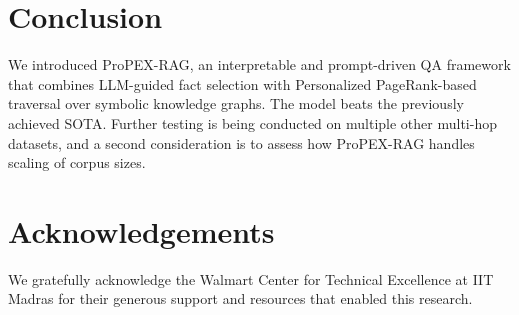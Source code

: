 \documentclass[runningheads]{llncs}
\begin{document}


\section{Conclusion}
\noindent
\justifying
We introduced ProPEX-RAG, an interpretable and prompt-driven QA framework that combines LLM-guided fact selection with Personalized PageRank-based traversal over symbolic knowledge graphs. The model beats the previously achieved SOTA. Further testing is being conducted on multiple other multi-hop datasets, and a second consideration is to assess how ProPEX-RAG handles scaling of corpus sizes.  

\section*{Acknowledgements}
We gratefully acknowledge the Walmart Center for Technical Excellence at IIT Madras for their generous support and resources that enabled this research.
\end{document}
